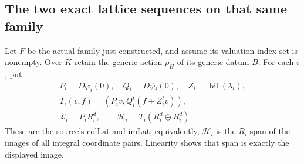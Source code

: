 \subsection{The two exact lattice sequences on that same family}
\label{subsec:faithful-family-exact-lattices}

Let \(F\) be the actual family just constructed,
and assume its valuation index set is nonempty.
Over \(K\) retain the generic action \(\rho_H\)
of its generic datum \(B\).
For each \(i\), put
\[
 \begin{gathered}
 P_i=D\varphi_i(0),\quad Q_i=D\psi_i(0),\quad
 Z_i=\operatorname{bil}(\lambda_i),\\
 T_i(v,f)=(P_iv,Q_i^t(f+Z_i^tv)),\\
 \mathcal L_i=P_iR_i^d,\qquad
                   \mathcal H_i=T_i(R_i^d\oplus R_i^d).
 \end{gathered}
 \tag{FF2}\label{eq:faithful-integral-family-lattices}
\]
These are the source's \(\mathrm{colLat}\) and
\(\mathrm{imLat}\); equivalently, \(\mathcal H_i\)
is the \(R_i\)-span of the images of all integral
coordinate pairs.
Linearity shows that span is exactly the displayed image.

